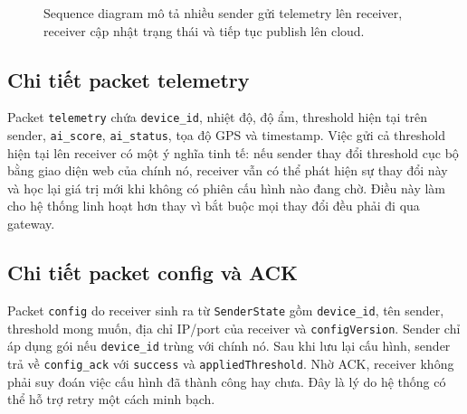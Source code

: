 \documentclass[12pt,a4paper]{report}
\begin{document}
\begin{figure}[H]
\centering
{}
\caption{Sequence diagram mô tả nhiều sender gửi telemetry lên receiver, receiver cập nhật trạng thái và tiếp tục publish lên cloud.}
\label{fig:seq-telemetry}
\end{figure}

\subsection{Chi tiết packet telemetry}
Packet \texttt{telemetry} chứa \texttt{device\_id}, nhiệt độ, độ ẩm, threshold hiện tại trên sender, \texttt{ai\_score}, \texttt{ai\_status}, tọa độ GPS và timestamp. Việc gửi cả threshold hiện tại lên receiver có một ý nghĩa tinh tế: nếu sender thay đổi threshold cục bộ bằng giao diện web của chính nó, receiver vẫn có thể phát hiện sự thay đổi này và học lại giá trị mới khi không có phiên cấu hình nào đang chờ. Điều này làm cho hệ thống linh hoạt hơn thay vì bắt buộc mọi thay đổi đều phải đi qua gateway.

\subsection{Chi tiết packet config và ACK}
Packet \texttt{config} do receiver sinh ra từ \texttt{SenderState} gồm \texttt{device\_id}, tên sender, threshold mong muốn, địa chỉ IP/port của receiver và \texttt{configVersion}. Sender chỉ áp dụng gói nếu \texttt{device\_id} trùng với chính nó. Sau khi lưu lại cấu hình, sender trả về \texttt{config\_ack} với \texttt{success} và \texttt{appliedThreshold}. Nhờ ACK, receiver không phải suy đoán việc cấu hình đã thành công hay chưa. Đây là lý do hệ thống có thể hỗ trợ retry một cách minh bạch.
\end{document}
